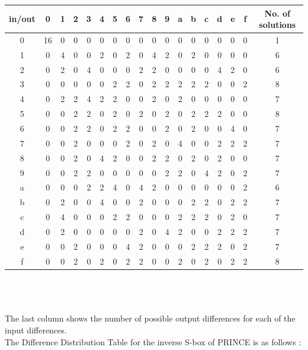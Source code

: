 \documentclass{transcrypto}
\begin{document}
\begin{tabular}{|c|c|c|c|c|c|c|c|c|c|c|c|c|c|c|c|c|c|}
\hline
in/out & 0 & 1 & 2 & 3 & 4 & 5 & 6 & 7 & 8 & 9 & a & b & c & d & e & f & No. of solutions \\
\hline
0 & 16 & 0 & 0 & 0 & 0 & 0 & 0 & 0 & 0 & 0 & 0 & 0 & 0 & 0 & 0 & 0 & 1 \\
\hline
1 & 0 & 4 & 0 & 0 & 2 & 0 & 2 & 0 & 4 & 2 & 0 & 2 & 0 & 0 & 0 & 0 & 6\\
\hline
2 & 0 & 2 & 0 & 4 & 0 & 0 & 0 & 2 & 2 & 0 & 0 & 0 & 0 & 4 & 2 & 0 & 6 \\
\hline
3 & 0 & 0 & 0 & 0 & 0 & 2 & 2 & 0 & 2 & 2 & 2 & 2 & 2 & 0 & 0 & 2 & 8\\
\hline
4 & 0 & 2 & 2 & 4 & 2 & 2 & 0 & 0 & 2 & 0 & 2 & 0 & 0 & 0 & 0 & 0 & 7 \\
\hline
5 & 0 & 0 & 2 & 2 & 0 & 2 & 0 & 2 & 0 & 2 & 0 & 2 & 2 & 2 & 0 & 0 & 8 \\
\hline
6 & 0 & 0 & 2 & 2 & 0 & 2 & 2 & 0 & 0 & 2 & 0 & 2 & 0 & 0 & 4 & 0 & 7 \\
\hline
7 & 0 & 0 & 2 & 0 & 0 & 0 & 2 & 0 & 2 & 0 & 4 & 0 & 0 & 2 & 2 & 2 & 7 \\
\hline
8 & 0 & 0 & 2 & 0 & 4 & 2 & 0 & 0 & 2 & 2 & 0 & 2 & 0 & 2 & 0 & 0 & 7 \\
\hline
9 & 0 & 0 & 2 & 2 & 0 & 0 & 0 & 0 & 0 & 2 & 2 & 0 & 4 & 2 & 0 & 2 & 7 \\
\hline
a & 0 & 0 & 0 & 2 & 2 & 4 & 0 & 4 & 2 & 0 & 0 & 0 & 0 & 0 & 0 & 2 & 6\\
\hline
b & 0 & 2 & 0 & 0 & 4 & 0 & 0 & 2 & 0 & 0 & 0 & 2 & 2 & 0 & 2 & 2 & 7\\
\hline
c & 0 & 4 & 0 & 0 & 0 & 2 & 2 & 0 & 0 & 0 & 2 & 2 & 2 & 0 & 2 & 0 & 7 \\
\hline
d & 0 & 2 & 0 & 0 & 0 & 0 & 0 & 2 & 0 & 4 & 2 & 0 & 0 & 2 & 2 & 2 & 7 \\
\hline
e & 0 & 0 & 2 & 0 & 0 & 0 & 4 & 2 & 0 & 0 & 0 & 2 & 2 & 2 & 0 & 2 & 7 \\
\hline
f & 0 & 0 & 2 & 0 & 2 & 0 & 2 & 2 & 0 & 0 & 2 & 0 & 2 & 0 & 2 & 2 & 8 \\
\hline
\end{tabular} \\ \\ \\
The last column shows the number of possible output differences for each of the input differences. 
\\ 
The Difference Distribution Table for the inverse S-box of PRINCE is as follows : \\ \\
\end{document}

